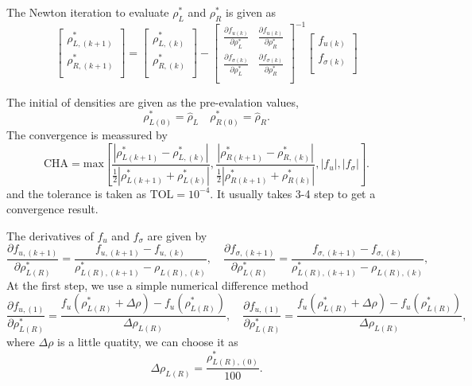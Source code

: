 \documentclass[review]{elsarticle}
\begin{document}
The Newton iteration to evaluate $\rho_L^*$ and $\rho_R^*$ is given as
\begin{equation}
\left[ \begin{array}{l}
 \rho _{L,(k+1)}^*\\
\rho_{R,(k+1)}^*\\
\end{array}
\right] = 
\left[ \begin{array}{l}
 \rho _{L,(k)}^*\\
\rho_{R,(k)}^*\\
\end{array}
\right]-
\left[ \begin{array}{ll}
\frac{\partial f_{u(k)}}{\partial \rho_L^*} & \frac{\partial f_{u(k)}}{\partial \rho_R^*}\\
\frac{\partial f_{\sigma(k)}}{\partial \rho_L^*} & \frac{\partial f_{\sigma(k)}}{\partial \rho_R^*}\\
\end{array}
\right]^{-1}
\left[ \begin{array}{l}
f_{u(k)}\\
f_{\sigma(k)}\\
\end{array}
\right]
\end{equation}

The initial of densities are given as the pre-evalation values,
\begin{equation}
  \rho_{L(0)}^* = \hat{\rho}_L \quad \rho_{R(0)}^* = \hat{\rho}_R.
\end{equation}
The  convergence is meassured by 
\begin{equation}
\text{CHA} = \text{max} \left[  
\frac{|\rho_{L(k+1)}^*- \rho_{L,(k)}^*|}{\frac{1}{2}|\rho_{L(k+1)}^*+\rho_{L(k)}^*|},   \frac{|\rho_{R(k+1)}^*- \rho_{R,(k)}^*|}{\frac{1}{2}|\rho_{R(k+1)}^*+\rho_{R(k)}^*|},|f_{u}|,|f_{\sigma}|\right].
\end{equation}
and the tolerance is taken as $\text{TOL} = 10^{-4}$. It usually takes 3-4 step to get a convergence result.

The derivatives of $f_{u}$ and $f_{\sigma}$ are given by
\begin{equation}
  \frac{\partial f_{u,(k+1)}}{\partial \rho^*_{L(R)}} = \frac{f_{u,(k+1)}-f_{u,(k)}}{\rho_{L(R),(k+1)}^* - \rho_{L(R),(k)}},\quad
  \frac{\partial f_{\sigma,(k+1)}}{\partial \rho^*_{L(R)}} = \frac{f_{\sigma,(k+1)}-f_{\sigma,(k)}}{\rho_{L(R),(k+1)}^* - \rho_{L(R),(k)}},
\end{equation}
At the first step, we use a simple  numerical difference  method
\begin{equation}
  \frac{\partial f_{u,(1)}}{\partial \rho^*_{L(R)}} = \frac{f_{u}(\rho^*_{L(R)}+\Delta \rho)-f_{u}(\rho^*_{L(R)})}{\Delta \rho_{L(R)}},\quad
  \frac{\partial f_{u,(1)}}{\partial \rho^*_{L(R)}} = \frac{f_{u}(\rho^*_{L(R)}+\Delta \rho)-f_{u}(\rho^*_{L(R)})}{\Delta \rho_{L(R)}},
\end{equation}
where $\Delta \rho$ is a little quatity, we can choose it as
\begin{equation}
  \Delta \rho_{L(R)} = \frac{\rho_{L(R),(0)}^*}{100}.
\end{equation}
\end{document}
